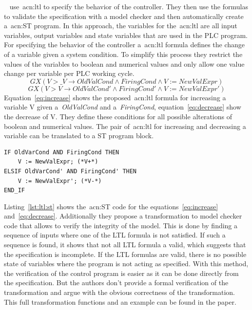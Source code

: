 \citeauthor{Kuzmin:2013}~\cite{Kuzmin:2013} use~\acrshort{acn:ltl} to specify the behavior of the controller.
They then use the formulas to validate the specification with a model checker and then automatically create a~\acrshort{acn:ST} program.
In this approach, the variables for the~\acrshort{acn:ltl} are all input variables, output variables and state variables that are used in the PLC program.
For specifying the behavior of the controller a~\acrfull{acn:ltl} formula defines the change of a variable given a system condition.
To simplify this process they restrict the values of the variables to boolean and numerical values and only allow one value change per variable per PLC working cycle.
\begin{equation}
GX\left(V > \_V \rightarrow OldValCond \land FiringCond \land V := NewValExpr \right)
\label{eq:increase}
\end{equation}
\begin{equation}
GX\left(V > V \rightarrow OldValCond' \land FiringCond' \land V := NewValExpr' \right)
\label{eq:decrease}
\end{equation}
Equation~\ref{eq:increase} shows the proposed~\acrshort{acn:ltl} formula for increasing a variable V given a~\textit{OldValCond} and a~\textit{FiringCond}, equation~\ref{eq:decrease} show the decrease of V.
They define these conditions for all possible alterations of boolean and numerical values.
The pair of~\acrshort{acn:ltl} for increasing and decreasing a variable can be translated to a ST program block.
\lstset{language=Pascal}
\begin{lstlisting}[caption={
Auto-generated~\gls{acn:ST} code realizing the~\acrshort{acn:ltl} formulas~\ref{eq:decrease} and~\ref{eq:increase}.~\cite{Kuzmin:2013}},label=lst:ltl:st]
IF OldVarCond AND FiringCond THEN
    V := NewValExpr; (*V+*)
ELSIF OldVarCond' AND FiringCond' THEN
    V := NewValExpr'; (*V-*)
END_IF
\end{lstlisting}
Listing~\ref{lst:ltl:st} shows the~\acrshort{acn:ST} code for the equations~\ref{eq:increase} and~\ref{eq:decrease}.
Additionally they propose a transformation to model checker code that allows to verify the integrity of the model.
This is done by finding a sequence of inputs where one of the LTL formula is not satisfied.
If such a sequence is found, it shows that not all LTL formula a valid, which suggests that the specification is incomplete.
If the LTL formulas are valid, there is no possible state of variables where the program is not acting as specified.
With this method, the verification of the control program is easier as it can be done directly from the specification.
But the authors don't provide a formal verification of the transformation and argue with the obvious correctness of the transformation.
This full transformation functions and an example can be found in the paper.

